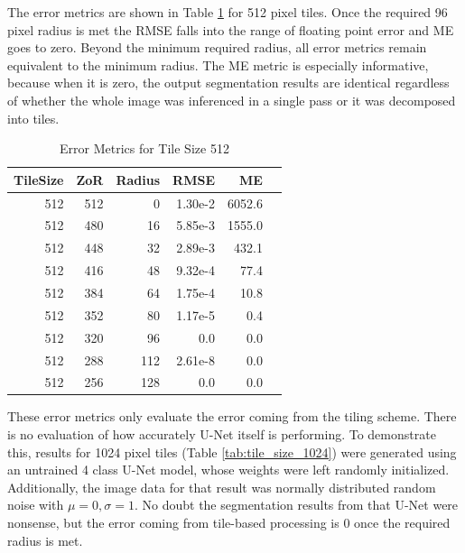 \documentclass[letterpaper]{article} %
\begin{document}
The error metrics are shown in Table \ref{tab:tile_size_512} for 512 pixel tiles. Once the required 96 pixel radius is met the RMSE falls into the range of floating point error and ME goes to zero. Beyond the minimum required radius, all error metrics remain equivalent to the minimum radius. 
The ME metric is especially informative, because when it is zero, the output segmentation results are identical regardless of whether the whole image was inferenced in a single pass or it was decomposed into tiles. 

\begin{table}[h!]
	\centering
\caption{Error Metrics for Tile Size 512}
\label{tab:tile_size_512}
\begin{tabular}{rrrrrr}
	TileSize & ZoR & Radius & RMSE    & ME  \\ 
	\hline
512 & 512 & 0 & 1.30e-2 & 6052.6 \\
512 & 480 & 16 & 5.85e-3 & 1555.0 \\
512 & 448 & 32 & 2.89e-3 & 432.1 \\
512 & 416 & 48 & 9.32e-4 & 77.4 \\
512 & 384 & 64 & 1.75e-4 & 10.8 \\
512 & 352 & 80 & 1.17e-5 & 0.4 \\
512 & 320 & 96 & 0.0 & 0.0 \\
512 & 288 & 112 & 2.61e-8 & 0.0 \\
512 & 256 & 128 & 0.0 & 0.0 \\
\end{tabular}
\end{table}

These error metrics only evaluate the error coming from the tiling scheme. There is no evaluation of how accurately U-Net itself is performing. 
To demonstrate this, results for 1024 pixel tiles (Table \ref{tab:tile_size_1024}) were generated using an untrained 4 class U-Net model, whose weights were left randomly initialized. Additionally, the image data for that result was normally distributed random noise with $\mu = 0, \sigma = 1$. No doubt the segmentation results from that U-Net were nonsense, but the error coming from tile-based processing is 0 once the required radius is met.
\end{document}
